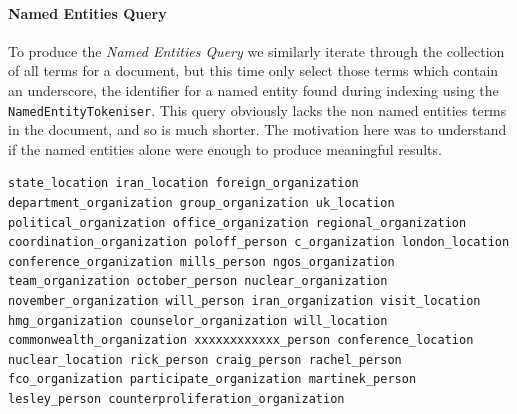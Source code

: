 \documentclass{l4proj}
\newcommand{\code}[1]{\texttt{#1}}
\newenvironment{codelisting}{\captionsetup{type=listing}}{}
\begin{document}
\paragraph{Named Entities Query}
To produce the \textit{Named Entities Query} we similarly iterate through the collection of all terms for a document, but this time only select those terms which contain an underscore, the identifier for a named entity found during indexing using the \code{NamedEntityTokeniser}. This query obviously lacks the non named entities terms in the document, and so is much shorter. The motivation here was to understand if the named entities alone were enough to produce meaningful results.
\begin{codelisting}
\begin{verbatim}
state_location iran_location foreign_organization department_organization group_organization uk_location political_organization office_organization regional_organization coordination_organization poloff_person c_organization london_location conference_organization mills_person ngos_organization team_organization october_person nuclear_organization november_organization will_person iran_organization visit_location hmg_organization counselor_organization will_location commonwealth_organization xxxxxxxxxxxx_person conference_location nuclear_location rick_person craig_person rachel_person fco_organization participate_organization martinek_person lesley_person counterproliferation_organization
\end{verbatim}
\label{code:ne_query}
\end{codelisting}
\end{document}
